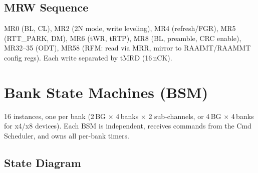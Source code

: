 \documentclass[10pt,a4paper]{article}
\begin{document}
\subsection{MRW Sequence}

MR0 (BL, CL), MR2 (2N mode, write leveling), MR4 (refresh/FGR), MR5 (RTT\_PARK, DM),
MR6 (tWR, tRTP), MR8 (BL, preamble, CRC enable), MR32--35 (ODT), MR58 (RFM: read via
MRR, mirror to RAAIMT/RAAMMT config regs). Each write separated by tMRD (16\,nCK).

\section{Bank State Machines (BSM)}

16 instances, one per bank (2\,BG $\times$ 4\,banks $\times$ 2 sub-channels, or
4\,BG $\times$ 4\,banks for x4/x8 devices). Each BSM is independent, receives commands
from the Cmd Scheduler, and owns all per-bank timers.

\subsection{State Diagram}
\end{document}
